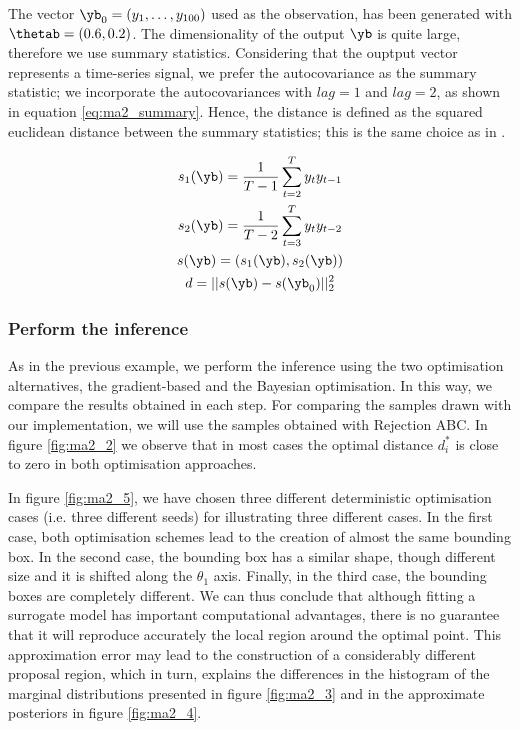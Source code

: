 \noindent
The vector $\yb_0 = (y_1, \ldots, y_{100})$ used as the observation,
has been generated with $\thetab=(0.6, 0.2)$. The dimensionality of
the output $\yb$ is quite large, therefore we use summary
statistics. Considering that the ouptput vector represents a
time-series signal, we prefer the autocovariance as the summary
statistic; we incorporate the autocovariances with $lag=1$ and
$lag=2$, as shown in equation \eqref{eq:ma2_summary}. Hence, the
distance is defined as the squared euclidean distance between the
summary statistics; this is the same choice as in \cite{Marin2012}.

\begin{gather} \label{eq:ma2_summary}
  s_1(\yb) = \frac{1}{T-1} \sum_{t=2}^T y_ty_{t-1}\\
  s_2(\yb) = \frac{1}{T-2} \sum_{t=3}^T y_ty_{t-2} \\
  s(\yb) = (s_1(\yb), s_2(\yb))\\
  d = ||s(\yb) - s(\yb_0)||_2^2
\end{gather}


\subsubsection*{Perform the inference}

As in the previous example, we perform the inference using the two
optimisation alternatives, the gradient-based and the Bayesian
optimisation. In this way, we compare the results obtained in each
step. For comparing the samples drawn with our implementation, we will
use the samples obtained with Rejection ABC. In figure \ref{fig:ma2_2}
we observe that in most cases the optimal distance $d_i^*$ is close to
zero in both optimisation approaches.

In figure \ref{fig:ma2_5}, we have chosen three different
deterministic optimisation cases (i.e. three different seeds) for
illustrating three different cases. In the first case, both
optimisation schemes lead to the creation of almost the same bounding
box. In the second case, the bounding box has a similar shape, though
different size and it is shifted along the $\theta_1$ axis. Finally,
in the third case, the bounding boxes are completely different. We can
thus conclude that although fitting a surrogate model has important
computational advantages, there is no guarantee that it will reproduce
accurately the local region around the optimal point. This
approximation error may lead to the construction of a considerably
different proposal region, which in turn, explains the differences in
the histogram of the marginal distributions presented in figure
\ref{fig:ma2_3} and in the approximate posteriors in figure
\ref{fig:ma2_4}.

